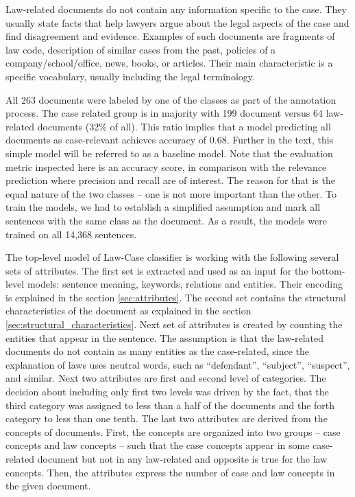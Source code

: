 \documentclass[
  digital, %
  notable,   %
  nolof,     %
  nolot,     %
  draft
]{fithesis3}
\begin{document}
Law-related documents do not contain any information specific to the case.
They usually state facts that help lawyers argue about the legal aspects of the case and find disagreement and evidence.
Examples of such documents are fragments of law code, description of similar cases from the past, policies of a company/school/office, news, books, or articles.
Their main characteristic is a specific vocabulary, usually including the legal terminology.

All 263 documents were labeled by one of the classes as part of the annotation process.
The case related group is in majority with 199 document versus 64 law-related documents (32\% of all).
This ratio implies that a model predicting all documents as case-relevant achieves accuracy of 0.68.
Further in the text, this simple model will be referred to as a baseline model.
Note that the evaluation metric inspected here is an accuracy score, in comparison with the relevance prediction where precision and recall are of interest.
The reason for that is the equal nature of the two classes -- one is not more important than the other.
To train the models, we had to establish a simplified assumption and mark all sentences with the same class as the document.
As a result, the models were trained on all 14,368 sentences.

The top-level model of Law-Case classifier is working with the following several sets of attributes.
The first set is extracted and used as an input for the bottom-level models: sentence meaning, keywords, relations and entities.
Their encoding is explained in the section \ref{sec:attributes}.
The second set contains the structural characteristics of the document as explained in the section \ref{sec:structural_characteristics}.
Next set of attributes is created by counting the entities that appear in the sentence.
The assumption is that the law-related documents do not contain as many entities as the case-related, since the explanation of laws uses neutral words, such as ``defendant'', ``subject'', ``suspect'', and similar.
Next two attributes are first and second level of categories.
The decision about including only first two levels was driven by the fact, that the third category was assigned to less than a half of the documents and the forth category to less than one tenth.
The last two attributes are derived from the concepts of documents.
First, the concepts are organized into two groups -- case concepts and law concepts -- such that the case concepts appear in some case-related document but not in any law-related and opposite is true for the law concepts.
Then, the attributes express the number of case and law concepts in the given document.
\end{document}
